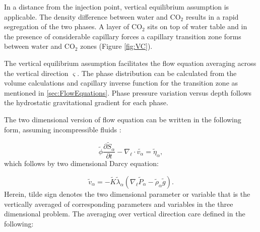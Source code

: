 In a distance from the injection point, vertical equilibrium assumption is
applicable. The density difference between water and $\mbox{CO}_2$ results in a
rapid
segregation of the two phases. A layer of $\mbox{CO}_2$ sits on top of water
table and in
the presence of considerable capillary forces a capillary transition zone forms
between water and $\mbox{CO}_2$ zones (Figure \ref{fig:VC}).

The vertical equilibrium assumption facilitates the flow equation averaging
across the vertical direction $\varsigma$. The phase distribution can be
calculated from the volume calculations and capillary inverse function for the
transition zone as mentioned in \ref{sec:FlowEquations}. Phase pressure
variation versus depth follows the hydrostatic gravitational gradient for each
phase.

The two dimensional version of flow equation can be written in the following
form, assuming incompressible fluids \cite{moll2011field,celia2011geological}:

\begin{equation}
 \tilde{\phi}\frac{\partial \tilde{S}_{\alpha}}{\partial
t}-\nabla_{\ell}\cdot \tilde{v_{\alpha}}=\tilde{\eta}_{\alpha},
\label{eq:cont_}
\end{equation} which follows by two dimensional Darcy equation:

\begin{equation}
\tilde{v}_{\alpha}=-\tilde{K}\tilde{\lambda}_{\alpha}(\nabla_{\ell}
\tilde{P}_{\alpha}-\tilde{\rho}_{\alpha}\tilde{g}). 
\label{eq:Darcy_}
\end{equation}Herein, tilde sign denotes the two dimensional parameter or
variable that is the vertically averaged of corresponding parameters and
variables in the three dimensional problem. The averaging over vertical
direction care defined in the following:

